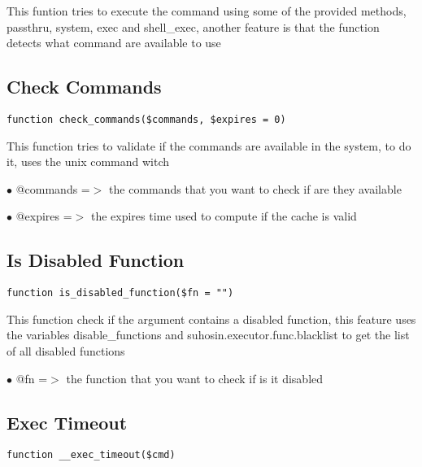 \documentclass[a4paper]{book}
\begin{document}
This funtion tries to execute the command using some of the
provided methods, passthru, system, exec and shell\_exec, another
feature is that the function detects what command are available
to use

\hypertarget{toc118}{}
\subsection{Check Commands}

\begin{lstlisting}
function check_commands($commands, $expires = 0)
\end{lstlisting}

This function tries to validate if the commands are available
in the system, to do it, uses the unix command witch

\begin{compactitem}
\item[\color{myblue}$\bullet$] @commands =$>$ the commands that you want to check if are they available
\item[\color{myblue}$\bullet$] @expires  =$>$ the expires time used to compute if the cache is valid
\end{compactitem}

\hypertarget{toc119}{}
\subsection{Is Disabled Function}

\begin{lstlisting}
function is_disabled_function($fn = "")
\end{lstlisting}

This function check if the argument contains a disabled
function, this feature uses the variables disable\_functions
and suhosin.executor.func.blacklist to get the list of all
disabled functions

\begin{compactitem}
\item[\color{myblue}$\bullet$] @fn =$>$ the function that you want to check if is it disabled
\end{compactitem}

\hypertarget{toc120}{}
\subsection{Exec Timeout}

\begin{lstlisting}
function __exec_timeout($cmd)
\end{lstlisting}
\end{document}
